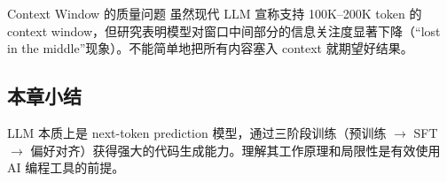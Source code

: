 \begin{warningbox}{Context Window 的质量问题}
虽然现代 LLM 宣称支持 100K--200K token 的 context window，但研究表明模型对窗口中间部分的信息关注度显著下降（``lost in the middle''现象）。不能简单地把所有内容塞入 context 就期望好结果。
\end{warningbox}

\subsection{本章小结}

LLM 本质上是 next-token prediction 模型，通过三阶段训练（预训练 $\rightarrow$ SFT $\rightarrow$ 偏好对齐）获得强大的代码生成能力。理解其工作原理和局限性是有效使用 AI 编程工具的前提。

